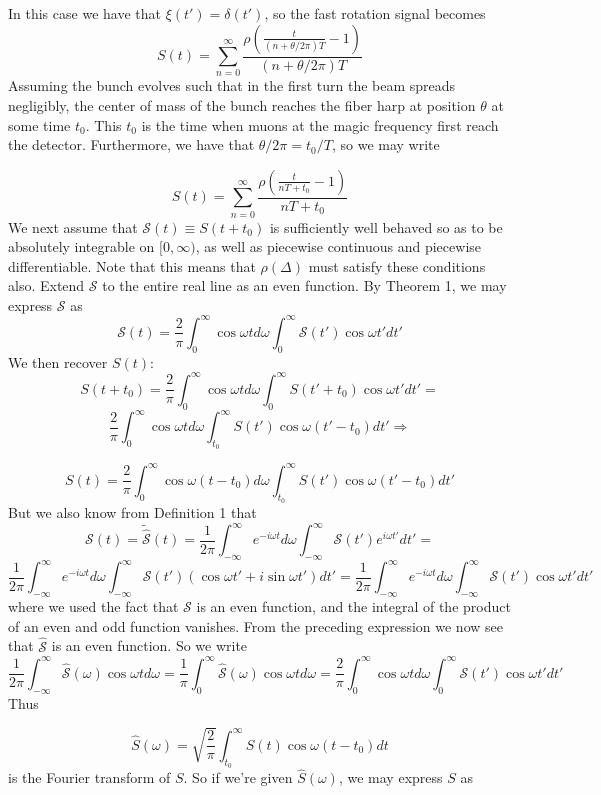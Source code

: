 In this case we have that $\xi(t')=\delta(t')$, so the fast rotation signal becomes \[S(t)=\sum^{\infty}_{n=0}\frac{\rho\left(\frac{t}{(n+\theta/2\pi)T}-1\right)}{(n+\theta/2\pi)T}\]
Assuming the bunch evolves such that in the first turn the beam spreads negligibly, the center of mass of the bunch reaches the fiber harp at position $\theta$ at some time $t_0$. This $t_0$ is the time when muons at the magic frequency first reach the detector. Furthermore, we have that $\theta/2\pi=t_0/T$, so we may write 

\[
S(t)=\sum^{\infty}_{n=0}\frac{\rho\left(\frac{t}{nT+t_0}-1\right)}{nT+t_0}
\]
We next assume that $\mathcal{S}(t)\equiv S(t+t_0)$ is sufficiently well behaved so as to be absolutely integrable on $[0,\infty)$, as well as piecewise continuous and piecewise differentiable. Note that this means that $\rho(\Delta)$ must satisfy these conditions also. Extend $\mathcal{S}$ to the entire real line as an even function. By Theorem 1, we may express $\mathcal{S}$ as \[\mathcal{S}(t)=\frac{2}{\pi}\int^{\infty}_0\cos\omega td\omega\int^{\infty}_0\mathcal{S}(t')\cos\omega t'dt'\] We then recover $S(t)$:\[S(t+t_0)=\frac{2}{\pi}\int^{\infty}_0\cos\omega td\omega\int^{\infty}_0S(t'+t_0)\cos\omega t'dt'=\]\[\frac{2}{\pi}\int^{\infty}_0\cos\omega td\omega\int^{\infty}_{t_0}S(t')\cos\omega(t'-t_0)dt'\Rightarrow\]

\[
S(t)=\frac{2}{\pi}\int^{\infty}_0\cos\omega(t-t_0)d\omega\int^{\infty}_{t_0}S(t')\cos\omega(t'-t_0)dt'
\] 
But we also know from Definition 1 that \[\mathcal{S}(t)=\tilde{\hat{\mathcal{S}}}(t)=\frac{1}{2\pi}\int^{\infty}_{-\infty}e^{-i\omega t}d\omega\int^{\infty}_{-\infty}\mathcal{S}(t')e^{i\omega t'}dt'=\]\[\frac{1}{2\pi}\int^{\infty}_{-\infty}e^{-i\omega t}d\omega\int^{\infty}_{-\infty}\mathcal{S}(t')(\cos\omega t'+i\sin\omega t')dt'=\frac{1}{2\pi}\int^{\infty}_{-\infty}e^{-i\omega t}d\omega\int^{\infty}_{-\infty}\mathcal{S}(t')\cos\omega t'dt'\] where we used the fact that $\mathcal{S}$ is an even function, and the integral of the product of an even and odd function vanishes. From the preceding expression we now see that $\hat{\mathcal{S}}$ is an even function. So we write \[\frac{1}{2\pi}\int^{\infty}_{-\infty}\hat{\mathcal{S}}(\omega)\cos\omega td\omega=\frac{1}{\pi}\int^{\infty}_0\hat{\mathcal{S}}(\omega)\cos\omega td\omega=\frac{2}{\pi}\int^{\infty}_0\cos\omega td\omega\int^{\infty}_0\mathcal{S}(t')\cos\omega t'dt'\] Thus 

\begin{equation}
\hat{S}(\omega)=\sqrt{\frac{2}{\pi}}\int^{\infty}_{t_0}S(t)\cos\omega(t-t_0)dt
\label{eq:nospreadFT}
\end{equation} 
is the Fourier transform of $S$. So if we're given $\hat{S}(\omega)$, we may express $S$ as 

